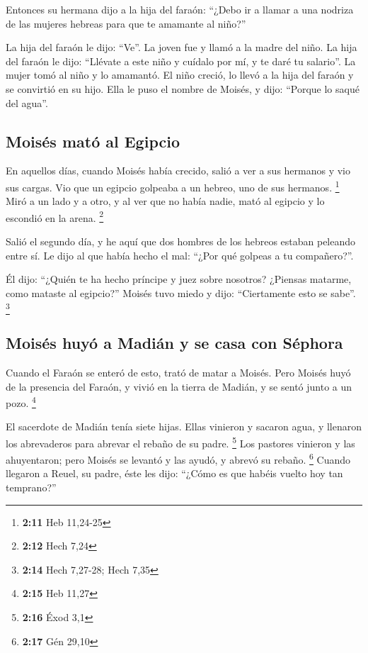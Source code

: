 \begin{paracol}{2}
 Entonces su hermana dijo a la hija del faraón: ``¿Debo ir
a llamar a una nodriza de las mujeres hebreas para que te amamante al
niño?''

 La hija del faraón le dijo: ``Ve''. La joven fue y llamó
a la madre del niño.  La hija del faraón le dijo:
``Llévate a este niño y cuídalo por mí, y te daré tu salario''. La mujer
tomó al niño y lo amamantó.  El niño creció, lo llevó a
la hija del faraón y se convirtió en su hijo. Ella le puso el nombre de
Moisés, y dijo: ``Porque lo saqué del agua''.

\hypertarget{moisuxe9s-matuxf3-al-egipcio}{%
\subsection{Moisés mató al Egipcio}\label{moisuxe9s-matuxf3-al-egipcio}}

 En aquellos días, cuando Moisés había crecido, salió a
ver a sus hermanos y vio sus cargas. Vio que un egipcio golpeaba a un
hebreo, uno de sus hermanos. \footnote{\textbf{2:11} Heb 11,24-25}
 Miró a un lado y a otro, y al ver que no había nadie,
mató al egipcio y lo escondió en la arena. \footnote{\textbf{2:12} Hech
  7,24}

 Salió el segundo día, y he aquí que dos hombres de los
hebreos estaban peleando entre sí. Le dijo al que había hecho el mal:
``¿Por qué golpeas a tu compañero?''.

 Él dijo: ``¿Quién te ha hecho príncipe y juez sobre
nosotros? ¿Piensas matarme, como mataste al egipcio?'' Moisés tuvo miedo
y dijo: ``Ciertamente esto se sabe''. \footnote{\textbf{2:14} Hech
  7,27-28; Hech 7,35}

\hypertarget{moisuxe9s-huyuxf3-a-madiuxe1n-y-se-casa-con-suxe9phora}{%
\subsection{Moisés huyó a Madián y se casa con
Séphora}\label{moisuxe9s-huyuxf3-a-madiuxe1n-y-se-casa-con-suxe9phora}}

 Cuando el Faraón se enteró de esto, trató de matar a
Moisés. Pero Moisés huyó de la presencia del Faraón, y vivió en la
tierra de Madián, y se sentó junto a un pozo. \footnote{\textbf{2:15}
  Heb 11,27}

 El sacerdote de Madián tenía siete hijas. Ellas vinieron
y sacaron agua, y llenaron los abrevaderos para abrevar el rebaño de su
padre. \footnote{\textbf{2:16} Éxod 3,1}  Los pastores
vinieron y las ahuyentaron; pero Moisés se levantó y las ayudó, y abrevó
su rebaño. \footnote{\textbf{2:17} Gén 29,10}  Cuando
llegaron a Reuel, su padre, éste les dijo: ``¿Cómo es que habéis vuelto
hoy tan temprano?''


\end{paracol}
